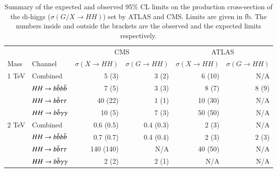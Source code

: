 \begin{table}[htbp]
    \caption{Summary of the expected and observed 95\% CL limits on the production cross-section of the di-higgs ($\sigma(G/X\rightarrow HH)$) set by ATLAS and CMS. 
        Limits are given in fb. The numbers inside and outside the brackets are the observed and the expected limits respectively.}
    \centering
    \begin{tabular}{ll|rr|rr}
        \toprule
                                    &                   & \multicolumn{2}{c|}{CMS}                                   & \multicolumn{2}{c}{ATLAS}                                \\
        Mass                        & Channel           & $\sigma(X\rightarrow HH)$    & $\sigma(G\rightarrow HH)$   & $\sigma(X\rightarrow HH)$ & $\sigma(G\rightarrow HH)$    \\
        \midrule
        \multirow{4}{*}{1 TeV}      & Combined          & 5 (3)                            & 3 (2)                           & 6 (10)                          & N/A            \\
                                    & $HH\rightarrow b\bar{b}b\bar{b}$         & 7 (5)                            & 3 (3)                           & 8 (7)                           & 8 (9)          \\
                                    & $HH\rightarrow b\bar{b}\tau\tau$         & 40 (22)                          & 1 (1)                           & 10 (30)                         & N/A            \\
                                    & $HH\rightarrow b\bar{b}\gamma\gamma$         & 10 (5)                           & 7 (3)                           & 50 (50)                         & N/A            \\
        \midrule                                                       
        \multirow{4}{*}{2 TeV}      & Combined          & 0.6 (0.5)                        & 0.4 (0.3)                       & 2 (3)                           & N/A            \\
                                    & $HH\rightarrow b\bar{b}b\bar{b}$         & 0.7 (0.7)                        & 0.4 (0.4)                       & 2 (3)                           & 2 (3)          \\
                                    & $HH\rightarrow b\bar{b}\tau\tau$         & 140 (140)                        & N/A                             & 40 (50)                         & N/A            \\
                                    & $HH\rightarrow b\bar{b}\gamma\gamma$         & 2 (2)                            & 2 (1)                           & N/A                             & N/A            \\

\end{tabular}
\end{table}
